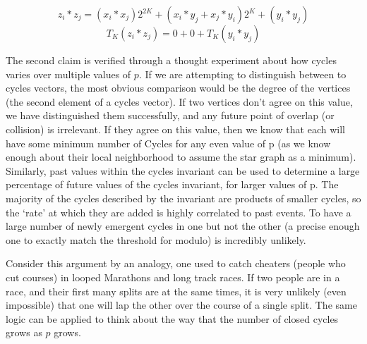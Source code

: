 $$z_i * z_j = (x_i*x_j)2^{2K} + (x_i*y_j + x_j*y_i)2^K + (y_i * y_j)$$
$$T_K(z_i * z_j) = 0 + 0 + T_K(y_i * y_j)$$

The second claim is verified through a thought experiment about how cycles varies over multiple values of $p$.
If we are attempting to distinguish between to cycles vectors, the most obvious comparison would be the degree of the vertices (the second element of a cycles vector).
If two vertices don't agree on this value, we have distinguished them successfully, and any future point of overlap (or collision) is irrelevant. 
If they agree on this value, then we know that each will have some minimum number of Cycles for any even value of p (as we know enough about their local neighborhood to assume the star graph as a minimum). 
Similarly, past values within the cycles invariant can be used to determine a large percentage of future values of the cycles invariant, for larger values of p.
The majority of the cycles described by the invariant are products of smaller cycles, so the `rate' at which they are added is highly correlated to past events.
To have a large number of newly emergent cycles in one but not the other (a precise enough one to exactly match the threshold for modulo) is incredibly unlikely.

Consider this argument by an analogy, one used to catch cheaters (people who cut courses) in looped Marathons and long track races.
If two people are in a race, and their first many splits are at the same times, it is very unlikely (even impossible) that one will lap the other over the course of a single split.
The same logic can be applied to think about the way that the number of closed cycles grows as $p$ grows.


